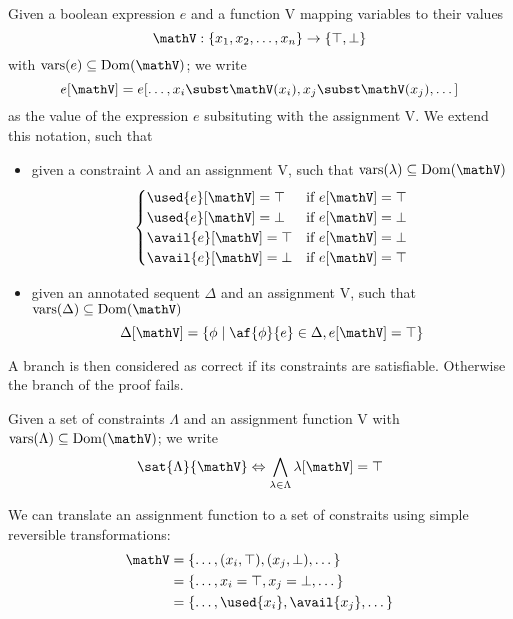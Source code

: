 \begin{define}[Evaluation]
	Given a boolean expression $e$ and a function V mapping variables to their values 
	$$ \mathV : \{ x_1, x_2, \dots, x_n \} \rightarrow \{ \top, \bot \} $$
	with $\mathrm{vars}(e) \subseteq \mathrm{Dom}(\mathV)$; we write
		$$ e[\mathV] = e[\dots, x_i \subst \mathV(x_i), x_j \subst \mathV(x_j), \dots] $$
	as the value of the expression $e$ subsituting with the assignment V.
	We extend this notation, such that
	\begin{itemize}
		\item given a constraint $\lambda$ and an assignment V, such that $\mathrm{vars}(\lambda) \subseteq \mathrm{Dom}(\mathV)$
			$$ 
			\begin{cases} 
				\used{e}[\mathV] = \top & \text{if } e[\mathV] = \top \\
				\used{e}[\mathV] = \bot & \text{if } e[\mathV] = \bot \\
				\avail{e}[\mathV] = \top & \text{if } e[\mathV] = \bot \\
				\avail{e}[\mathV] = \bot & \text{if } e[\mathV] = \top \\
			\end{cases}
			$$
		\item given an annotated sequent $\Delta$ and an assignment V, such that $\mathrm{vars}(\Delta) \subseteq \mathrm{Dom}(\mathV)$
			$$ \Delta[\mathV] = \{ \phi \mid \af{\phi}{e} \in \Delta , e[\mathV] = \top \} $$
	\end{itemize}
\end{define}
A branch is then considered as correct if its constraints are satisfiable.
Otherwise the branch of the proof fails.
\begin{define}
	\label{def:sat}
	Given a set of constraints $\Lambda$ and an assignment function V with $\mathrm{vars}(\Lambda) \subseteq \mathrm{Dom}(\mathV)$; we write 
	$$ \sat{\Lambda}{\mathV} \Leftrightarrow \bigwedge_{\lambda \in \Lambda} \lambda[\mathV] = \top $$
\end{define}
\begin{fact}
	\label{fact:ass-trans}
	We can translate an assignment function to a set of constraits using simple reversible transformations:
	\begin{align*}
		\mathV &= \{ \dots, (x_i, \top), (x_j, \bot), \dots \} \\
		       &= \{ \dots, x_i = \top, x_j = \bot, \dots \} \\
		       &= \{ \dots, \used{x_i}, \avail{x_j}, \dots \}
	\end{align*}
\end{fact}

